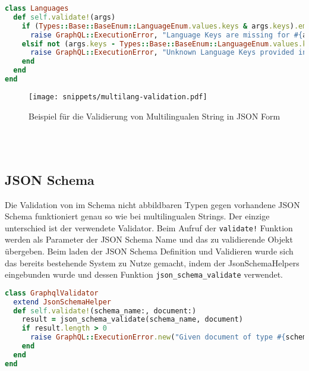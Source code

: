 \begin{lstlisting}[language=Ruby,float=h!,caption={Validator Klasse zum Prüfen, ob der übergebene Parameter die Beschaffenheit eines multilingualen Strings aufweist. \lstinline|/graphql/validators/languages.rb|}, label={lst:multilang-validation}]
class Languages
  def self.validate!(args)
    if (Types::Base::BaseEnum::LanguageEnum.values.keys & args.keys).empty?
      raise GraphQL::ExecutionError, "Language Keys are missing for #{args}"
    elsif not (args.keys - Types::Base::BaseEnum::LanguageEnum.values.keys).empty?
      raise GraphQL::ExecutionError, "Unknown Language Keys provided in #{args}"
    end
  end
end
\end{lstlisting}

\begin{figure}[h!]
    \centering
    \texttt{[image: snippets/multilang-validation.pdf]}
    \caption{Beispiel für die Validierung von Multilingualen String in JSON Form}
    \label{req:typesafe:example}
\end{figure}

\ \\
\ \\

\subsection{JSON Schema}
Die Validation von im Schema nicht abbildbaren Typen gegen vorhandene JSON Schema funktioniert genau so wie bei multilingualen Strings. Der einzige unterschied ist der verwendete Validator. Beim Aufruf der \lstinline|validate!| Funktion werden als Parameter der JSON Schema Name und das zu validierende Objekt übergeben. Beim laden der JSON Schema Definition und Validieren wurde sich das bereits bestehende System zu Nutze gemacht, indem der JsonSchemaHelpers eingebunden wurde und dessen Funktion \lstinline|json_schema_validate| verwendet. 

\begin{lstlisting}[language=Ruby,float=h!,caption={Validator Klasse zum Prüfen, ob der übergebene Parameter die Beschaffenheit des JSON Schema aufweist. \lstinline|/graphql/validators/graphql_validator.rb|}, label={lst:jsonschema-validation}]
class GraphqlValidator
  extend JsonSchemaHelper
  def self.validate!(schema_name:, document:)
    result = json_schema_validate(schema_name, document)
    if result.length > 0
      raise GraphQL::ExecutionError.new("Given document of type #{schema_name} does not match the schema[...]", extensions: { code: 'VALIDATION' })
    end
  end
end
\end{lstlisting}


